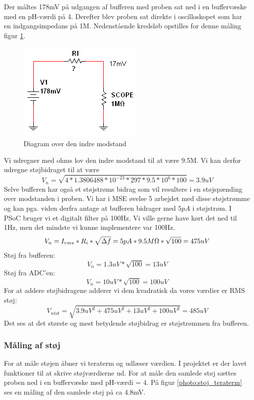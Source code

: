 Der måltes 178mV på udgangen af bufferen med proben sat ned i en buffervæske med en pH-værdi på 4. Derefter blev proben sat direkte i oscilloskopet som har en indgangsimpedans på 1M\ohm . Nedenstående kredsløb opstilles for denne måling figur \ref{photo:Kredslob_RI}. 


 \begin{figure}[H]
	\centering 
	\includegraphics[scale=1]{HardwareArkitektur/Sensore/pH_probe_billeder/Kredslob_RI.png}
	\caption{Diagram over den indre modstand}
	\label{photo:Kredslob_RI}
\end{figure} 

Vi udregner med ohms lov den indre modstand til at være 9.5M\ohm . Vi kan derfor udregne støjbidraget til at være
$$ V_n = \sqrt{4*1.3806488*10^{-23}*297*9.5*10^{6}*100} = 3.9uV $$
Selve bufferen har også et støjstrøms bidrag som vil resultere i en støjspænding over modstanden i proben. Vi har i MSE øvelse 5 arbejdet med disse støjstrømme og kan pga. viden derfra antage at bufferen bidrager med $5pA$ i støjstrøm. I PSoC bruger vi et digitalt filter på 100Hz. Vi ville gerne have kørt det ned til 1Hz, men det mindste vi kunne implementere var 100Hz.
$$ V_n = I_{rms}*R_i*\sqrt{\Delta f} = 5pA*9.5M\ohm *\sqrt{100} = 475uV $$
Støj fra bufferen:
$$ V_n = 1.3uV * \sqrt{100} = 13uV $$
Støj fra ADC'en:
$$ V_n = 10uV * \sqrt{100} = 100uV $$
For at addere støjbidragene adderer vi dem kvadratisk da vores værdier er RMS støj:
$$ V_{ntot} = \sqrt{3.9uV^2 + 475uV^2 + 13uV^2 + 100uV^2} = 485uV $$
Det ses at det største og mest betydende støjbidrag er støjstrømmen fra bufferen. 

\subsubsection{Måling af støj}

For at måle støjen åbner vi teraterm og udlæser værdien. I projektet er der lavet funktioner til at skrive støjværdierne ud. For at måle den samlede støj sættes proben ned i en buffervæske med pH-værdi = 4. På figur \ref{photo:stoj_teraterm} ses en måling af den samlede støj på ca 4.8mV.

